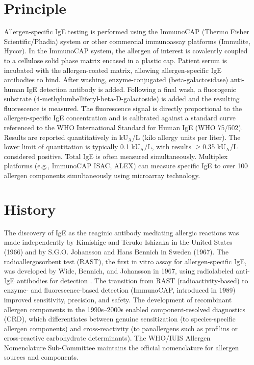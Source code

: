 \section*{Principle}
Allergen-specific IgE testing is performed using the ImmunoCAP (Thermo Fisher Scientific/Phadia) system or other commercial immunoassay platforms (Immulite, Hycor). In the ImmunoCAP system, the allergen of interest is covalently coupled to a cellulose solid phase matrix encased in a plastic cap. Patient serum is incubated with the allergen-coated matrix, allowing allergen-specific IgE antibodies to bind. After washing, enzyme-conjugated (beta-galactosidase) anti-human IgE detection antibody is added. Following a final wash, a fluorogenic substrate (4-methylumbelliferyl-beta-D-galactoside) is added and the resulting fluorescence is measured. The fluorescence signal is directly proportional to the allergen-specific IgE concentration and is calibrated against a standard curve referenced to the WHO International Standard for Human IgE (WHO 75/502). Results are reported quantitatively in kU$_\text{A}$/L (kilo allergy units per liter). The lower limit of quantitation is typically 0.1 kU$_\text{A}$/L, with results $\geq$0.35 kU$_\text{A}$/L considered positive. Total IgE is often measured simultaneously. Multiplex platforms (e.g., ImmunoCAP ISAC, ALEX) can measure specific IgE to over 100 allergen components simultaneously using microarray technology.

\section*{History}
The discovery of IgE as the reaginic antibody mediating allergic reactions was made independently by Kimishige and Teruko Ishizaka in the United States (1966) \cite{ishizaka1966physicochemical} and by S.G.O. Johansson and Hans Bennich in Sweden (1967). The radioallergosorbent test (RAST), the first in vitro assay for allergen-specific IgE, was developed by Wide, Bennich, and Johansson in 1967, using radiolabeled anti-IgE antibodies for detection \cite{wide1967diagnosis}. The transition from RAST (radioactivity-based) to enzyme- and fluorescence-based detection (ImmunoCAP, introduced in 1989) improved sensitivity, precision, and safety. The development of recombinant allergen components in the 1990s--2000s enabled component-resolved diagnostics (CRD), which differentiates between genuine sensitization (to species-specific allergen components) and cross-reactivity (to panallergens such as profilins or cross-reactive carbohydrate determinants). The WHO/IUIS Allergen Nomenclature Sub-Committee maintains the official nomenclature for allergen sources and components.

